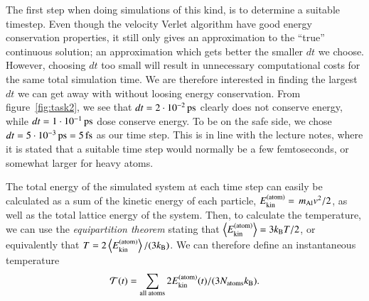 The first step when doing simulations of this kind, is to determine a suitable timestep. Even though the velocity Verlet algorithm have good energy conservation properties, it still only gives an approximation to the ``true'' continuous solution; an approximation which gets better the smaller $dt$ we choose. However, choosing $dt$ too small will result in unnecessary computational costs for the same total simulation time. We are therefore interested in finding the largest $dt$ we can get away with without loosing energy conservation. From figure~\ref{fig:task2}, we see that $dt = \unit[2 \cdot 10^{-2}]{ps}$ clearly does not conserve energy, while $dt = \unit[1 \cdot 10^{-1}]{ps}$ dose conserve energy. To be on the safe side, we chose $dt = \unit[5 \cdot 10^{-3}]{ps} = \unit[5]{fs}$ as our time step. This is in line with the lecture notes, where it is stated that a suitable time step would normally be a few femtoseconds, or somewhat larger for heavy atoms.

The total energy of the simulated system at each time step can easily be calculated as a sum of the kinetic energy of each particle, $E_{\rm kin}^{\rm(atom)}=\,m_{\rm Al}v^2/2$, as well as the total lattice energy of the system. Then, to calculate the temperature, we can use the \emph{equipartition theorem} stating that $\ev{E_{\rm kin}^{\rm(atom)}}=3k_{\rm B}T/2$, or equivalently that $T=2\ev{E_{\rm kin}^{\rm(atom)}}/(3k_{\rm B})$. We can therefore define an instantaneous temperature
\begin{equation}
\label{eq:T_instantaneous}
\mathcal{T}(t)=\sum_{\text{all atoms}}2E_{\rm kin}^{\rm(atom)}(t)/(3N_{\rm atoms}k_{\rm B}).
\end{equation}


